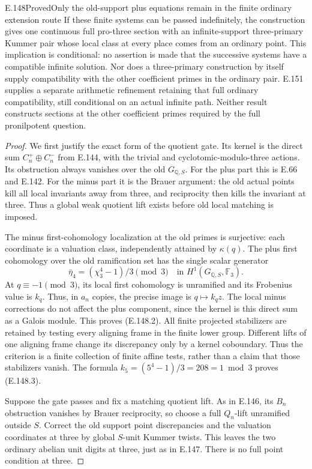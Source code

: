 \begin{result}{E.148}{Proved}{Only the old-support plus equations remain in the finite ordinary extension route}
If these finite systems can be passed indefinitely,
the construction gives one continuous full
pro-three section with an infinite-support
three-primary Kummer pair whose local class at
every place comes from an ordinary point.
This implication is conditional: no assertion
is made that the successive systems have a
compatible infinite solution. Nor does a
three-primary construction by itself supply compatibility
with the other coefficient primes in the ordinary pair.
E.151 supplies a separate arithmetic refinement retaining
that full ordinary compatibility, still conditional on an
actual infinite path. Neither result constructs sections
at the other coefficient primes required by the full
pronilpotent question.
\end{result}
\begin{proof}
We first justify the exact form of the quotient
gate. Its kernel is the direct sum
\(C_n^+\oplus C_n^-\) from E.144, with the
trivial and cyclotomic-modulo-three actions.
Its obstruction always vanishes over the
old \(G_{\mathbb Q,S}\).
For the plus part this is E.66 and E.142.
For the minus part it is the Brauer argument:
the old actual points kill all local
invariants away from three, and reciprocity
then kills the invariant at three.
Thus a global weak quotient lift exists
before old local matching is imposed.

The minus first-cohomology localization
at the old primes is surjective:
each coordinate is a valuation class,
independently attained by \(\kappa(q)\).
The plus first cohomology over the old
ramification set has the single scalar
generator
\[
 \bar\eta_4
       =(\chi_3^4-1)/3\pmod3
           \quad\text{in }H^1(G_{\mathbb Q,S},\mathbb F_3).
 \tag{E.148.4}
\]
At \(q\equiv-1\pmod3\), its local first
cohomology is unramified and its Frobenius
value is \(k_q\). Thus, in \(a_n\) copies,
the precise image is \(q\mapsto k_qz\).
The local minus corrections do not affect
the plus component, since the kernel
is this direct sum as a Galois module.
This proves (E.148.2).
All finite projected stabilizers are
retained by testing every aligning
frame in the finite lower group.
Different lifts of one aligning frame
change its discrepancy only by a
kernel coboundary. Thus the criterion
is a finite collection of finite affine
tests, rather than a claim that those
stabilizers vanish.
The formula \(k_5=(5^4-1)/3=208=1\bmod3\)
proves (E.148.3).

Suppose the gate passes and fix a matching
quotient lift. As in E.146, its \(B_n\)
obstruction vanishes by Brauer reciprocity,
so choose a full \(Q_n\)-lift unramified
outside \(S\). Correct the old support
point discrepancies and the valuation
coordinates at three by global \(S\)-unit
Kummer twists.
This leaves the two ordinary abelian
unit digits at three, just as in E.147.
There is no full point condition at three.


\end{proof}
